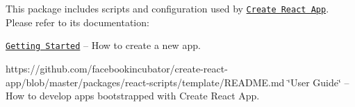 This package includes scripts and configuration used by \href{https://github.com/facebookincubator/create-react-app}{\tt Create React App}.~\newline
 Please refer to its documentation\+:


\begin{DoxyItemize}
\item \href{https://github.com/facebookincubator/create-react-app/blob/master/README.md#getting-started}{\tt Getting Started} – How to create a new app.
\item https\+://github.com/facebookincubator/create-\/react-\/app/blob/master/packages/react-\/scripts/template/\+R\+E\+A\+D\+M\+E.\+md \char`\"{}\+User Guide\char`\"{} – How to develop apps bootstrapped with Create React App. 
\end{DoxyItemize}